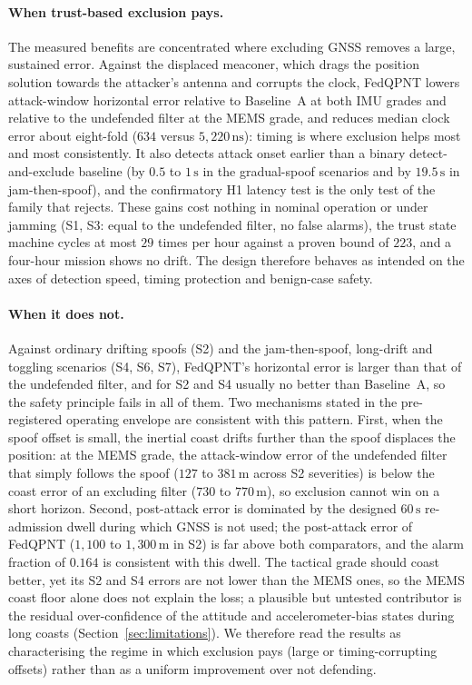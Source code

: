 \documentclass[journal]{IEEEtran}
\begin{document}
\paragraph{When trust-based exclusion pays.} The measured benefits are concentrated where excluding GNSS removes a large, sustained error. Against the displaced meaconer, which drags the position solution towards the attacker's antenna and corrupts the clock, FedQPNT lowers attack-window horizontal error relative to Baseline~A at both IMU grades and relative to the undefended filter at the MEMS grade, and reduces median clock error about eight-fold ($634$ versus $5{,}220\,\mathrm{ns}$): timing is where exclusion helps most and most consistently. It also detects attack onset earlier than a binary detect-and-exclude baseline (by $0.5$ to $1\,\mathrm{s}$ in the gradual-spoof scenarios and by $19.5\,\mathrm{s}$ in jam-then-spoof), and the confirmatory H1 latency test is the only test of the family that rejects. These gains cost nothing in nominal operation or under jamming (S1, S3: equal to the undefended filter, no false alarms), the trust state machine cycles at most $29$ times per hour against a proven bound of $223$, and a four-hour mission shows no drift. The design therefore behaves as intended on the axes of detection speed, timing protection and benign-case safety.

\paragraph{When it does not.} Against ordinary drifting spoofs (S2) and the jam-then-spoof, long-drift and toggling scenarios (S4, S6, S7), FedQPNT's horizontal error is larger than that of the undefended filter, and for S2 and S4 usually no better than Baseline~A, so the safety principle fails in all of them. Two mechanisms stated in the pre-registered operating envelope are consistent with this pattern. First, when the spoof offset is small, the inertial coast drifts further than the spoof displaces the position: at the MEMS grade, the attack-window error of the undefended filter that simply follows the spoof ($127$ to $381\,\mathrm{m}$ across S2 severities) is below the coast error of an excluding filter ($730$ to $770\,\mathrm{m}$), so exclusion cannot win on a short horizon. Second, post-attack error is dominated by the designed $60\,\mathrm{s}$ re-admission dwell during which GNSS is not used; the post-attack error of FedQPNT ($1{,}100$ to $1{,}300\,\mathrm{m}$ in S2) is far above both comparators, and the alarm fraction of $0.164$ is consistent with this dwell. The tactical grade should coast better, yet its S2 and S4 errors are not lower than the MEMS ones, so the MEMS coast floor alone does not explain the loss; a plausible but untested contributor is the residual over-confidence of the attitude and accelerometer-bias states during long coasts (Section~\ref{sec:limitations}). We therefore read the results as characterising the regime in which exclusion pays (large or timing-corrupting offsets) rather than as a uniform improvement over not defending.
\end{document}
